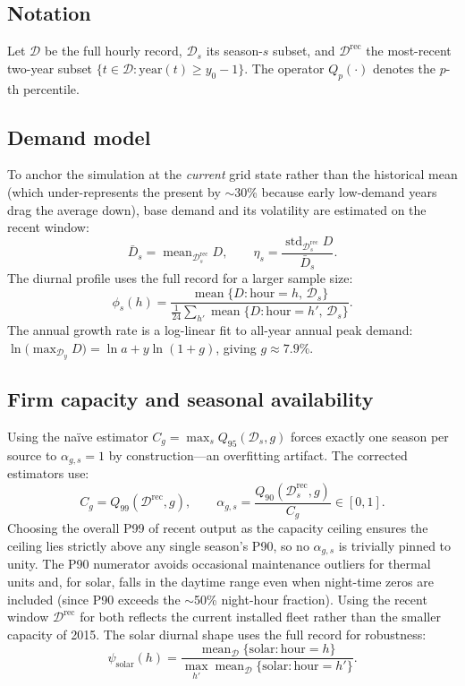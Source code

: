 \documentclass[11pt]{article}
\begin{document}
\subsection*{Notation}
Let $\mathcal{D}$ be the full hourly record, $\mathcal{D}_s$ its season-$s$
subset, and $\mathcal{D}^{\!\mathrm{rec}}$ the most-recent two-year subset
$\{t\in\mathcal{D}: \text{year}(t)\ge y_0-1\}$.
The operator $Q_p(\cdot)$ denotes the $p$-th percentile.

\subsection*{Demand model}
To anchor the simulation at the \emph{current} grid state rather than the
historical mean (which under-represents the present by $\sim$30\% because
early low-demand years drag the average down), base demand and its volatility
are estimated on the recent window:
\begin{equation}
\bar{D}_s = \operatorname{mean}_{\mathcal{D}^{\!\mathrm{rec}}_s} D,
\qquad
\eta_s = \frac{\operatorname{std}_{\mathcal{D}^{\!\mathrm{rec}}_s} D}{\bar{D}_s}.
\end{equation}
The diurnal profile uses the full record for a larger sample size:
\begin{equation}
\phi_s(h) = \frac{\operatorname{mean}\{D : \text{hour}=h,\,\mathcal{D}_s\}}
{\frac1{24}\sum_{h'}\operatorname{mean}\{D:\text{hour}=h',\,\mathcal{D}_s\}}.
\end{equation}
The annual growth rate is a log-linear fit to all-year annual peak demand:
$\ln\!\big(\max_{\mathcal{D}_y}D\big)=\ln a + y\ln(1+g)$, giving $g\approx7.9\%$.

\subsection*{Firm capacity and seasonal availability}
Using the naïve estimator $C_g=\max_s Q_{95}(\mathcal{D}_s,g)$ forces exactly
one season per source to $\alpha_{g,s}=1$ by construction---an overfitting
artifact. The corrected estimators use:
\begin{equation}
C_g = Q_{99}\!\left(\mathcal{D}^{\!\mathrm{rec}}, g\right),
\qquad
\alpha_{g,s} = \frac{Q_{90}\!\left(\mathcal{D}^{\!\mathrm{rec}}_s, g\right)}{C_g}
\in[0,1].
\label{eq:newcap}
\end{equation}
Choosing the overall P99 of recent output as the capacity ceiling ensures the
ceiling lies strictly above any single season's P90, so no $\alpha_{g,s}$ is
trivially pinned to unity. The P90 numerator avoids occasional maintenance
outliers for thermal units and, for solar, falls in the daytime range even when
night-time zeros are included (since P90 exceeds the $\sim$50\% night-hour
fraction). Using the recent window $\mathcal{D}^{\!\mathrm{rec}}$ for both
reflects the current installed fleet rather than the smaller capacity of 2015.
The solar diurnal shape uses the full record for robustness:
\begin{equation}
\psi_{\text{solar}}(h) = \frac{\operatorname{mean}_{\mathcal{D}}\{\text{solar}:\text{hour}=h\}}
{\max_{h'}\operatorname{mean}_{\mathcal{D}}\{\text{solar}:\text{hour}=h'\}}.
\end{equation}
\end{document}
